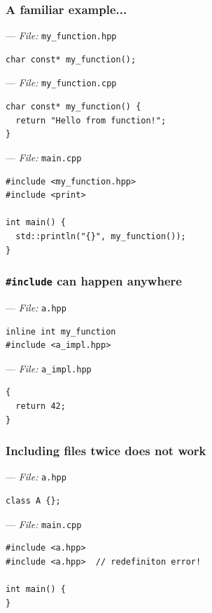 \documentclass[aspectratio=169]{beamer}
\newif\iftransitions
\newcommand{\cpause}{\iftransitions \pause \fi}
\begin{document}
\begin{frame}[fragile]
  \frametitle{A familiar example...}

  --- \textit{File:} \texttt{my\_function.hpp}
  \begin{lstlisting}[style=cpp20]
char const* my_function();
  \end{lstlisting}

  --- \textit{File:} \texttt{my\_function.cpp}
  \begin{lstlisting}[style=cpp20]
char const* my_function() {
  return "Hello from function!";
}
  \end{lstlisting}

  \cpause
  --- \textit{File:} \texttt{main.cpp}
  \begin{lstlisting}[style=cpp20]
#include <my_function.hpp>
#include <print>

int main() {
  std::println("{}", my_function());
}
  \end{lstlisting}

\end{frame}

\begin{frame}[fragile]
  \frametitle{\texttt{\#include} can happen anywhere}
  --- \textit{File:} \texttt{a.hpp}
  \begin{lstlisting}[style=cpp20]
inline int my_function
#include <a_impl.hpp>
  \end{lstlisting}

  --- \textit{File:} \texttt{a\_impl.hpp}
  \begin{lstlisting}[style=cpp20]
{
  return 42;
}
  \end{lstlisting}

\end{frame}


\begin{frame}[fragile]
  \frametitle{Including files twice does not work}

  --- \textit{File:} \texttt{a.hpp}
  \begin{lstlisting}[style=cpp20]
class A {};
  \end{lstlisting}

  --- \textit{File:} \texttt{main.cpp}
  \begin{lstlisting}[style=cpp20]
#include <a.hpp>
#include <a.hpp>  // redefiniton error!

int main() {
}
  \end{lstlisting}

\end{frame}
\end{document}
